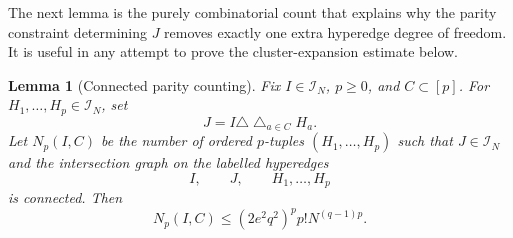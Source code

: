 \documentclass[11pt]{article}
\newtheorem{lemma}[theorem]{Lemma}
\newcommand{\calI}{\mathcal{I}}
\begin{document}
The next lemma is the purely combinatorial count that explains why the parity
constraint determining $J$ removes exactly one extra hyperedge degree of
freedom.  It is useful in any attempt to prove the cluster-expansion estimate below.

\begin{lemma}[Connected parity counting]
  \label{lem:connected-parity-counting}
  Fix $I\in\calI_N$, $p\geq0$, and $C\subset[p]$.  For
  $H_1,\ldots,H_p\in\calI_N$, set
  \begin{equation}\label{eq:J-from-cross-pairs-counting}
    J
    =
    I\triangle\bigtriangleup_{a\in C}H_a.
  \end{equation}
  Let $N_p(I,C)$ be the number of ordered $p$-tuples
  $(H_1,\ldots,H_p)$ such that $J\in\calI_N$ and the intersection graph on the
  labelled hyperedges
  \begin{equation}\label{eq:counting-labelled-hyperedges}
    I,
    \qquad
    J,
    \qquad
    H_1,\ldots,H_p
  \end{equation}
  is connected.  Then
  \begin{equation}\label{eq:connected-parity-counting}
    N_p(I,C)
    \leq
    (2e^2q^2)^p p! N^{(q-1)p}.
  \end{equation}
\end{lemma}
\end{document}
